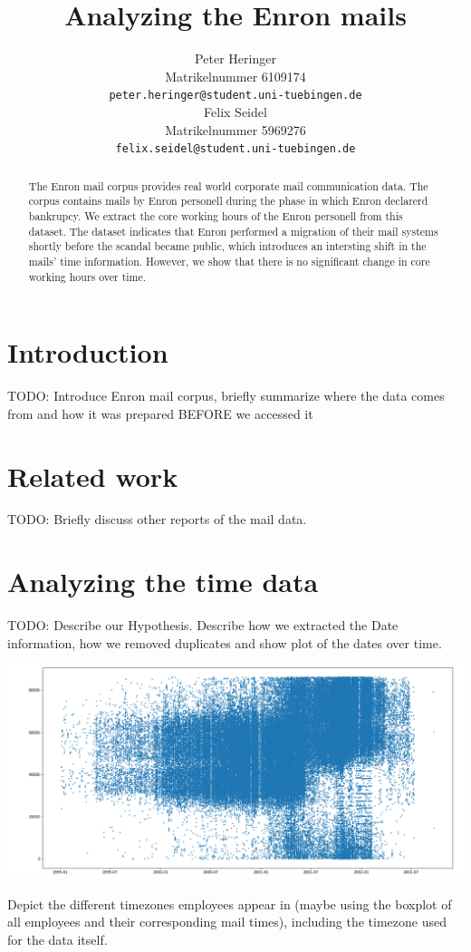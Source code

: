 \documentclass{article}
\title{Analyzing the Enron mails}
\author{%
  Peter Heringer\\
  Matrikelnummer 6109174 \\
  \texttt{peter.heringer@student.uni-tuebingen.de} \\
  \And
  Felix Seidel\\
  Matrikelnummer 5969276 \\
  \texttt{felix.seidel@student.uni-tuebingen.de} \\
}
\begin{document}
\maketitle

\begin{abstract}
  The Enron mail corpus provides real world corporate mail communication data. 
  The corpus contains mails by Enron personell during the phase in which Enron 
  declarerd bankrupcy. We extract the core working hours of the Enron personell 
  from this dataset. The dataset indicates that Enron performed a migration 
  of their mail systems shortly before the scandal became public, which
  introduces an intersting shift in the mails' time information. However, we
  show that there is no significant change in core working hours over time.
\end{abstract}

\section{Introduction}
TODO: Introduce Enron mail corpus, briefly summarize where the data comes from
and how it was prepared BEFORE we accessed it

\section{Related work}
TODO: Briefly discuss other reports of the mail data.

\section{Analyzing the time data}
TODO: Describe our Hypothesis. Describe how we extracted the Date information, 
how we removed duplicates and show plot of the dates over time.

\begin{center}
  \includegraphics[width=0.7\linewidth]{tmp/plot_all_mail.png}
\end{center}

Depict the different timezones employees appear in (maybe using the boxplot of
all employees and their corresponding mail times), including the timezone used
for the data itself.
\end{document}

